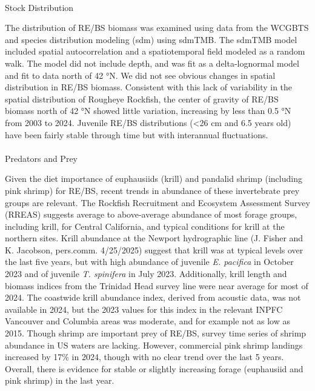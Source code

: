 \documentclass[
]{article}
\makeatletter
\let\oldparagraph\paragraph
\renewcommand{\paragraph}{
    \@ifstar
      \xxxParagraphStar
      \xxxParagraphNoStar
  }
\newcommand{\xxxParagraphStar}[1]{\oldparagraph*{#1}\mbox{}}
\newcommand{\xxxParagraphNoStar}[1]{\oldparagraph{#1}\mbox{}}
\makeatother
\begin{document}
\paragraph{Stock Distribution}\label{stock-distribution}

The distribution of RE/BS biomass was examined using data from the
WCGBTS and species distribution modeling (sdm) using sdmTMB. The sdmTMB
model included spatial autocorrelation and a spatiotemporal field
modeled as a random walk. The model did not include depth, and was fit
as a delta-lognormal model and fit to data north of 42 °N. We did not
see obvious changes in spatial distribution in RE/BS biomass. Consistent
with this lack of variability in the spatial distribution of Rougheye
Rockfish, the center of gravity of RE/BS biomass north of 42 °N showed
little variation, increasing by less than 0.5 °N from 2003 to 2024.
Juvenile RE/BS distributions (\textless26 cm and 6.5 years old) have
been fairly stable through time but with interannual fluctuations.

\paragraph{Predators and Prey}\label{predators-and-prey}

Given the diet importance of euphausiids (krill) and pandalid shrimp
(including pink shrimp) for RE/BS, recent trends in abundance of these
invertebrate prey groups are relevant. The Rockfish Recruitment and
Ecosystem Assessment Survey (RREAS) suggests average to above-average
abundance of most forage groups, including krill, for Central
California, and typical conditions for krill at the northern sites.
Krill abundance at the Newport hydrographic line (J. Fisher and K.
Jacobson, pers.comm. 4/25/2025) suggest that krill was at typical levels
over the last five years, but with high abundance of juvenile \emph{E.
pacifica} in October 2023 and of juvenile \emph{T. spinifera} in July
2023. Additionally, krill length and biomass indices from the Trinidad
Head survey line were near average for most of 2024. The coastwide krill
abundance index, derived from acoustic data, was not available in 2024,
but the 2023 values for this index in the relevant INPFC Vancouver and
Columbia areas was moderate, and for example not as low as 2015. Though
shrimp are important prey of RE/BS, survey time series of shrimp
abundance in US waters are lacking. However, commercial pink shrimp
landings increased by 17\% in 2024, though with no clear trend over the
last 5 years. Overall, there is evidence for stable or slightly
increasing forage (euphausiid and pink shrimp) in the last year.
\end{document}
